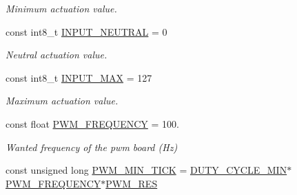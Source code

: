 \begin{DoxyCompactItemize}
\begin{DoxyCompactList}\small\item\em Minimum actuation value. \end{DoxyCompactList}\item 
const int8\+\_\+t \hyperlink{group__ActuationToOutput_ga5a9006872f4d527c3640197b6c080b35}{I\+N\+P\+U\+T\+\_\+\+N\+E\+U\+T\+R\+AL} = 0\hypertarget{group__ActuationToOutput_ga5a9006872f4d527c3640197b6c080b35}{}\label{group__ActuationToOutput_ga5a9006872f4d527c3640197b6c080b35}

\begin{DoxyCompactList}\small\item\em Neutral actuation value. \end{DoxyCompactList}\item 
const int8\+\_\+t \hyperlink{group__ActuationToOutput_ga54b4e4d7476d53406564c1e9159df212}{I\+N\+P\+U\+T\+\_\+\+M\+AX} = 127\hypertarget{group__ActuationToOutput_ga54b4e4d7476d53406564c1e9159df212}{}\label{group__ActuationToOutput_ga54b4e4d7476d53406564c1e9159df212}

\begin{DoxyCompactList}\small\item\em Maximum actuation value. \end{DoxyCompactList}\item 
const float \hyperlink{group__ActuationToOutput_ga1e7ca795ca78a0b20f4fbc06ea505cfb}{P\+W\+M\+\_\+\+F\+R\+E\+Q\+U\+E\+N\+CY} = 100.\hypertarget{group__ActuationToOutput_ga1e7ca795ca78a0b20f4fbc06ea505cfb}{}\label{group__ActuationToOutput_ga1e7ca795ca78a0b20f4fbc06ea505cfb}

\begin{DoxyCompactList}\small\item\em Wanted frequency of the pwm board (Hz) \end{DoxyCompactList}\item 
const unsigned long \hyperlink{group__ActuationToOutput_ga606bf90e7566da13c2e4c3d2ef163e6b}{P\+W\+M\+\_\+\+M\+I\+N\+\_\+\+T\+I\+CK} = \hyperlink{group__ActuationToOutput_gadf577758fd2164217d18fb25c119c974}{D\+U\+T\+Y\+\_\+\+C\+Y\+C\+L\+E\+\_\+\+M\+IN}$\ast$\hyperlink{group__ActuationToOutput_ga1e7ca795ca78a0b20f4fbc06ea505cfb}{P\+W\+M\+\_\+\+F\+R\+E\+Q\+U\+E\+N\+CY}$\ast$\hyperlink{group__ActuationToOutput_ga3de5d6c408f667c395ab2b236e059724}{P\+W\+M\+\_\+\+R\+ES}\hypertarget{group__ActuationToOutput_ga606bf90e7566da13c2e4c3d2ef163e6b}{}\label{group__ActuationToOutput_ga606bf90e7566da13c2e4c3d2ef163e6b}


\end{DoxyCompactItemize}
